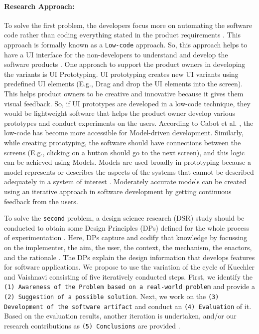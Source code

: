 \paragraph{Research Approach:} 
To solve the first problem, the developers focus more on automating the software code rather than coding everything stated in the product requirements \cite{article:prototyping:hoffnagle}.
This approach is formally known as a \texttt{Low-code} approach.
So, this approach helps to have a UI interface for the non-developers to understand and develop the software products \cite{paper:lowcode:khorram}.
One approach to support the product owners in developing the variants is UI Prototyping. 
UI prototyping creates new UI variants using predefined UI elements (E.g., Drag and drop the UI elements into the screen). 
This helps product owners to be creative and innovative because it gives them visual feedback.
So, if UI prototypes are developed in a low-code technique, they would be lightweight software that helps the product owner develop various prototypes and conduct experiments on the users.
According to Cabot et al. \cite{paper:lowcode:cabot}, the low-code has become more accessible for Model-driven development. 
Similarly, while creating prototyping, the software should have connections between the screens (E.g., clicking on a button should go to the next screen), and this logic can be achieved using Models.
Models are used broadly in prototyping because a model represents or describes the aspects of the systems that cannot be described adequately in a system of interest \cite{paper:prototyping:luqi}.
Moderately accurate models can be created using an iterative approach in software development by getting continuous feedback from the users.

To solve the \texttt{second} problem, a design science research (DSR) study should be conducted to obtain some Design Principles (DPs) defined for the whole process of experimentation \cite{paper:designprinciple:vk}. 
Here, DPs capture and codify that knowledge by focussing on the implementer, the aim, the user, the context, the mechanism, the enactors, and the rationale \cite{paper:designprinciple:gregor}. 
The DPs explain the design information that develops features for software applications.
We propose to use the variation of the cycle of Kuechler and Vaishnavi \cite{paper:designprinciple:vk} consisting of five iteratively conducted steps. 
First, we identify the 
\texttt{(1) Awareness of the Problem based on a real-world problem} and provide a
\texttt{(2) Suggestion of a possible solution}. Next, we work on the 
\texttt{(3) Development of the software artifact} and conduct an 
\texttt{(4) Evaluation} of it. Based on the evaluation results, another iteration is undertaken, and/or our research contributions as 
\texttt{(5) Conclusions} are provided \cite{misc:crowdsourcing:sg}.

